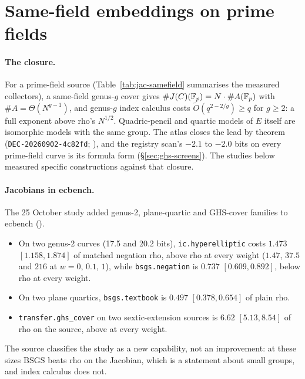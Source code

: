 \section{Same-field embeddings on prime fields}\label{sec:jac-samefield}

\paragraph{The closure.} For a prime-field source (Table~\ref{tab:jac-samefield}
summarises the measured collectors), a same-field genus-$g$
cover gives $\#J(C)(\mathbb{F}_p)=N\cdot\#A(\mathbb{F}_p)$ with $\#A=\Theta(N^{g-1})$, and
genus-$g$ index calculus costs $\tilde O(q^{2-2/g})\ge q$ for $g\ge2$: a full
exponent above rho's $N^{1/2}$. Quadric-pencil and quartic models of $E$
itself are isomorphic models with the same group. The atlas closes the
lead by theorem (\texttt{DEC-20260902-4c82fd};
),
and the registry scan's $-2.1$ to $-2.0$ bits on every prime-field curve is
its formula form (\S\ref{sec:ghs-screens}). The studies below measured
specific constructions against that closure.

\paragraph{Jacobians in ecbench.} The 25 October study added genus-2,
plane-quartic and GHS-cover families to ecbench
().
\begin{itemize}
\item On two genus-2 curves (17.5 and 20.2 bits), \texttt{ic.hyperelliptic}
  costs $1.473$ $[1.158,1.874]$ of matched negation rho, above rho at every
  weight ($1.47$, $37.5$ and $216$ at $w=0$, $0.1$, $1$), while
  \texttt{bsgs.negation} is $0.737$ $[0.609,0.892]$, below rho at every
  weight.
\item On two plane quartics, \texttt{bsgs.textbook} is $0.497$
  $[0.378,0.654]$ of plain rho.
\item \texttt{transfer.ghs\_cover} on two sextic-extension sources is
  $6.62$ $[5.13,8.54]$ of rho on the source, above at every weight.
\end{itemize}
The source classifies the study as a new capability, not an improvement:
at these sizes BSGS beats rho on the Jacobian, which is a statement about
small groups, and index calculus does not.

